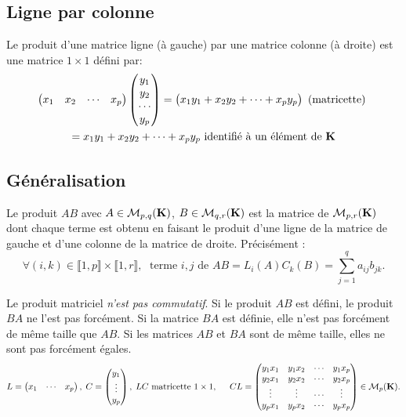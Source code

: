 \subsection{Ligne par colonne}
Le produit d'une matrice ligne (à gauche) par une matrice colonne (à droite) est une matrice $1\times 1$ défini par:
\begin{multline*}
 \begin{pmatrix}
  x_1 & x_2 & \cdots & x_p
 \end{pmatrix}
 \begin{pmatrix}
  y_1 \\ y_2 \\ \cdots \\ y_p
 \end{pmatrix}
=
 \begin{pmatrix}
  x_1y_1 + x_2 y_2 + \cdots + x_p y_p
 \end{pmatrix}
 \text{ (matricette) }\\
 = x_1y_1 + x_2 y_2 + \cdots + x_p y_p \text{ identifié à un élément de $\mathbf{K}$}
\end{multline*}

\subsection{Généralisation}
Le produit $AB$ avec $A\in \mathcal M_{p,q}(\mathbf{K})$, $B\in \mathcal M_{q,r}(\mathbf{K})$ est la matrice de $\mathcal M_{p,r}(\mathbf{K})$ dont chaque terme est obtenu en faisant le produit d'une ligne de la matrice de gauche et d'une colonne de la matrice de droite. Précisément : 
\[
 \forall (i,k)\in \llbracket 1,p\rrbracket \times \llbracket 1, r\rrbracket,\;
 \text{ terme $i,j$ de } AB = L_{i}(A)C_{k}(B) = \sum_{j=1}^q a_{i j}b_{j k}.
\]
\begin{rem}
 Le produit matriciel \emph{n'est pas commutatif}.\newline
 Si le produit $AB$ est défini, le produit $BA$ ne l'est pas forcément. Si la matrice $BA$ est définie, elle n'est pas forcément de même taille que $AB$. Si les matrices $AB$ et $BA$ sont de même taille, elles ne sont pas forcément égales.
\[
 L = \begin{pmatrix}
      x_1 & \cdots & x_p
     \end{pmatrix}, \;
 C = \begin{pmatrix}
      y_1 \\ \vdots \\ y_p
     \end{pmatrix}, \;
LC \text{ matricette } 1\times 1, \hspace{0.5cm}
CL = \begin{pmatrix}
      y_1x_1 & y_1x_2 & \cdots &y_1x_p \\
      y_2x_1 & y_2x_2 & \cdots &y_2x_p \\
      \vdots & \vdots & \cdots & \vdots \\
      y_px_1 & y_px_2 & \cdots &y_px_p \\
     \end{pmatrix}
\in \mathcal{M}_p(\mathbf{K}).
\]
\end{rem}

